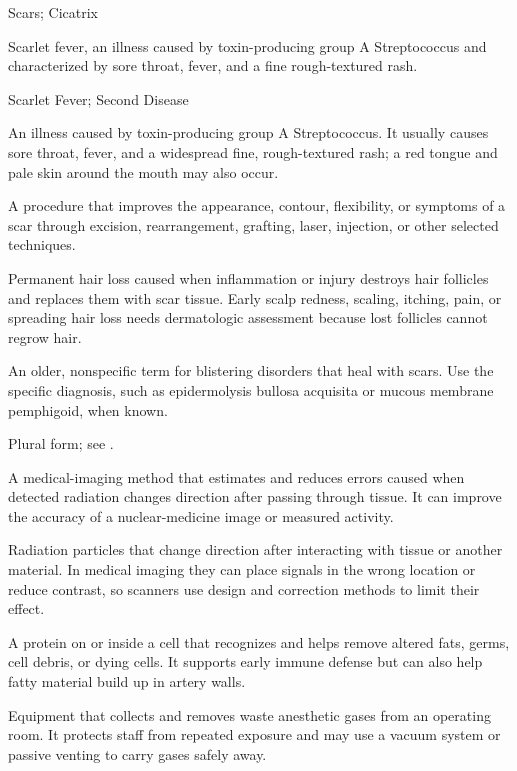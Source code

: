 \synonyms
Scars; Cicatrix

 Scarlet fever, an illness caused by toxin-producing group A Streptococcus and characterized by sore throat, fever, and a fine rough-textured rash.

\synonyms
Scarlet Fever; Second Disease

 An illness caused by toxin-producing group A Streptococcus. It usually causes sore throat, fever, and a widespread fine, rough-textured rash; a red tongue and pale skin around the mouth may also occur.

 A procedure that improves the appearance, contour, flexibility, or symptoms of a scar through excision, rearrangement, grafting, laser, injection, or other selected techniques.

 Permanent hair loss caused when inflammation or injury destroys hair follicles and replaces them with scar tissue. Early scalp redness, scaling, itching, pain, or spreading hair loss needs dermatologic assessment because lost follicles cannot regrow hair.

 An older, nonspecific term for blistering disorders that heal with scars. Use the specific diagnosis, such as epidermolysis bullosa acquisita or mucous membrane pemphigoid, when known.

 Plural form; see .

 A medical-imaging method that estimates and reduces errors caused when detected radiation changes direction after passing through tissue. It can improve the accuracy of a nuclear-medicine image or measured activity.

 Radiation particles that change direction after interacting with tissue or another material. In medical imaging they can place signals in the wrong location or reduce contrast, so scanners use design and correction methods to limit their effect.

 A protein on or inside a cell that recognizes and helps remove altered fats, germs, cell debris, or dying cells. It supports early immune defense but can also help fatty material build up in artery walls.

 Equipment that collects and removes waste anesthetic gases from an operating room. It protects staff from repeated exposure and may use a vacuum system or passive venting to carry gases safely away.

